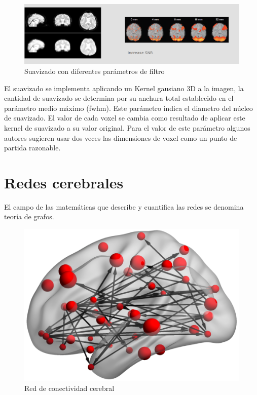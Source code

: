 \begin{figure}[H]
 \centering
    \includegraphics[scale=0.35]{img/smooth.png}
  \caption{Suavizado con diferentes parámetros de filtro}         \label{preproc:smooth}
\end{figure}

El suavizado se implementa aplicando un Kernel gausiano 3D a la imagen, la cantidad de suavizado se determina por su anchura total establecido en el parámetro medio máximo (fwhm). Este parámetro indica el diametro del núcleo de suavizado. El valor de cada voxel se cambia como resultado de aplicar este kernel de suavizado a su valor original. Para el valor de este parámetro algunos autores sugieren usar dos veces las dimensiones de voxel como un punto de partida razonable.\cite{brainhack}



\section{Redes cerebrales}
 
El campo de las matemáticas que describe y cuantifica las redes se denomina teoría de grafos.
 
 \begin{figure}[H]
  \centering
    \includegraphics[scale=0.5]{img/net.png}
  \caption{Red de conectividad cerebral}         \label{preproc:net}
\end{figure}

